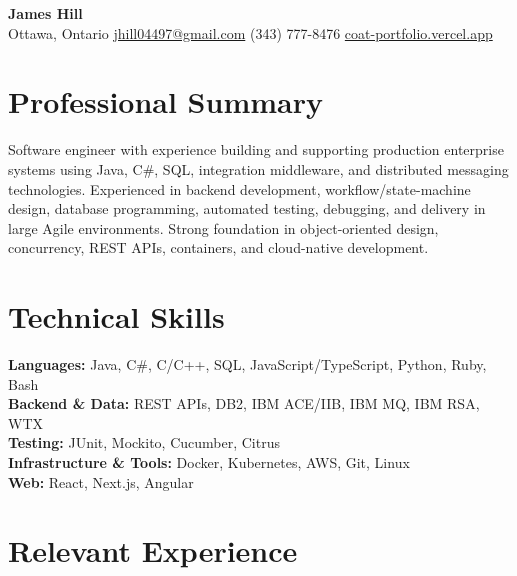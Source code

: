 \documentclass[10pt,letterpaper]{article}
\begin{document}
\begin{center}
 {\fontsize{20}{22}\selectfont\textbf{\color{heading}James Hill}}\\[4pt]
 \small Ottawa, Ontario \enspace {\color{rulecolor}$\vert$} \enspace
 \href{mailto:jhill04497@gmail.com}{jhill04497@gmail.com} \enspace {\color{rulecolor}$\vert$} \enspace
 (343) 777-8476 \enspace {\color{rulecolor}$\vert$} \enspace
 \href{https://coat-portfolio.vercel.app}{coat-portfolio.vercel.app}
\end{center}

\vspace{-5pt}
\section{Professional Summary}
Software engineer with experience building and supporting production enterprise systems using Java, C\#, SQL, integration middleware, and distributed messaging technologies. Experienced in backend development, workflow/state-machine design, database programming, automated testing, debugging, and delivery in large Agile environments. Strong foundation in object-oriented design, concurrency, REST APIs, containers, and cloud-native development.

\section{Technical Skills}
\textbf{Languages:} Java, C\#, C/C++, SQL, JavaScript/TypeScript, Python, Ruby, Bash\\
\textbf{Backend \& Data:} REST APIs, DB2, IBM ACE/IIB, IBM MQ, IBM RSA, WTX\\
\textbf{Testing:} JUnit, Mockito, Cucumber, Citrus\\
\textbf{Infrastructure \& Tools:} Docker, Kubernetes, AWS, Git, Linux\\
\textbf{Web:} React, Next.js, Angular

\section{Relevant Experience}
\end{document}
